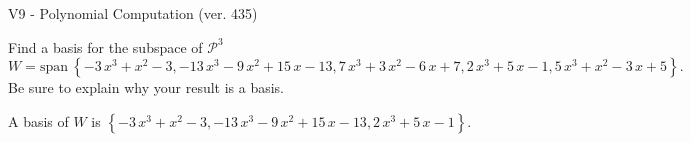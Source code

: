 \begin{exercise}
  \begin{exerciseTitle}V9 - Polynomial Computation (ver. 435)\end{exerciseTitle}
  \begin{exerciseStatement}
    Find a basis for the subspace of \(\mathcal{P}^3\) 
\[W=\mathrm{span}\ \left\{-3 \, x^{3} + x^{2} - 3 , -13 \, x^{3} - 9 \, x^{2} + 15 \, x - 13 , 7 \, x^{3} + 3 \, x^{2} - 6 \, x + 7 , 2 \, x^{3} + 5 \, x - 1 , 5 \, x^{3} + x^{2} - 3 \, x + 5\right\}.\]
 Be sure to explain why your result is a basis.


  \end{exerciseStatement}
  \begin{exerciseAnswer}
   A basis of \(W\) is  \(\left\{-3 \, x^{3} + x^{2} - 3 , -13 \, x^{3} - 9 \, x^{2} + 15 \, x - 13 , 2 \, x^{3} + 5 \, x - 1\right\}\).
  


  \end{exerciseAnswer}
\end{exercise}